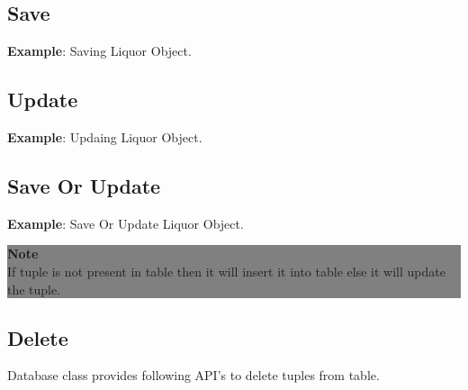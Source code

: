	\subsection{Save}
		

			\par
			\textbf{Example}: Saving Liquor Object.
				


	\subsection{Update}
		

			\par
			\textbf{Example}: Updaing Liquor Object.
				


	\subsection{Save Or Update}
		

			\par
			\textbf{Example}: Save Or Update Liquor Object.
				



			\begin{center}
				\colorbox{grey}{
				\parbox[t]{.8\linewidth}{
					\fontsize{11pt}{11pt}\selectfont %
					\vspace*{0.1cm} %

					\hfill \textbf{Note} \\
					If tuple is not present in table then it will insert it into table else it will update the tuple.

					\vspace*{0.0cm} %
					}
			}

			\end{center}


	\subsection{Delete}
		\par 
		Database class provides following API's to delete tuples from table.

